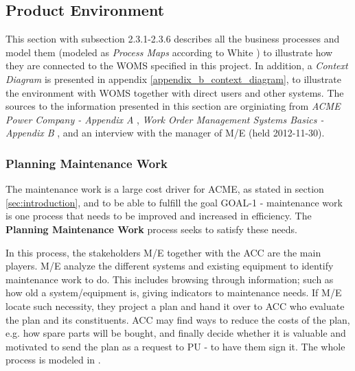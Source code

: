 \subsection{Product Environment}
\label{sec:product_environment}
This section with subsection 2.3.1-2.3.6 describes all the business processes and model them (modeled as \emph{Process Maps} according to White \cite{bpmn}) to illustrate how they are connected to the WOMS specified in this project. In addition, a \emph{Context Diagram} is presented in appendix \ref{appendix_b_context_diagram}, to illustrate the environment with WOMS together with direct users and other systems. The sources to the information presented in this section are orginiating from \emph{ACME Power Company - Appendix A} \cite{A}, \emph{Work Order Management Systems Basics - Appendix B} \cite{B}, and an interview with the manager of M/E (held 2012-11-30).
\subsubsection{Planning Maintenance Work}
\label{sec:bp1}
The maintenance work is a large cost driver for ACME, as stated in section \ref{sec:introduction}, and to be able to fulfill the goal GOAL-1 - maintenance work is one process that needs to be improved and increased in efficiency. The \textbf{Planning Maintenance Work} process seeks to satisfy these needs. 

In this process, the stakeholders M/E together with the ACC are the main players. M/E analyze the different systems and existing equipment to identify maintenance work to do. This includes browsing through information; such as how old a system/equipment is, giving indicators to maintenance needs. If M/E locate such necessity, they project a plan and hand it over to ACC who evaluate the plan and its constituents. ACC may find ways to reduce the costs of the plan, e.g. how spare parts will be bought, and finally decide whether it is valuable and motivated to send the plan as a request to PU - to have them sign it. The whole process is modeled in .

